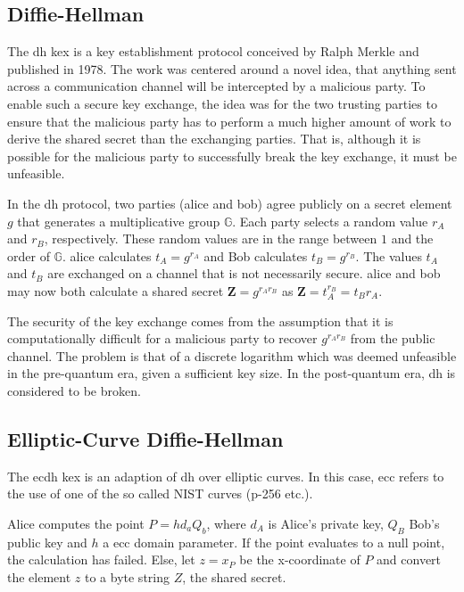 \subsection{Diffie-Hellman}
\label{section:background:diffie-hellman}

The \gls{dh} \gls{kex} is a key establishment protocol conceived by Ralph Merkle and published in 1978\cite{merkle1978}. The work was centered around a novel idea, that anything sent across a communication channel will be intercepted by a malicious party. To enable such a secure key exchange, the idea was for the two trusting parties to ensure that the malicious party has to perform a much higher amount of work to derive the shared secret than the exchanging parties. That is, although it is possible for the malicious party to successfully break the key exchange, it must be unfeasible\cite{merkle1978}.

In the \gls{dh} protocol, two parties (\gls{alice} and \gls{bob}) agree publicly on a secret element $g$ that generates a multiplicative group $\mathbb{G}$. Each party selects a random value $r_A$ and $r_B$, respectively. These random values are in the range between $1$ and the order of $\mathbb{G}$. \gls{alice} calculates $t_A=g^{r_A}$ and Bob calculates $t_B=g^{r_B}$. The values $t_A$ and $t_B$ are exchanged on a channel that is not necessarily secure. \gls{alice} and \gls{bob} may now both calculate a shared secret $\mathbf{Z}=g^{r_A r_B}$ as $\mathbf{Z}=t_A^{r_B}=t_B{r_A}$\cite{merkle1978, boyd2020}.

The security of the key exchange comes from the assumption that it is computationally difficult for a malicious party to recover $g^{r_A r_B}$ from the public channel. The problem is that of a discrete logarithm which was deemed unfeasible in the pre-quantum era, given a sufficient key size\cite{boyd2020}. In the post-quantum era, \gls{dh} is considered to be broken\cite{bernstein2017}.

\subsection{Elliptic-Curve Diffie-Hellman}

The \gls{ecdh} \gls{kex} is an adaption of \gls{dh} over elliptic curves. In this case, \gls{ecc} refers to the use of one of the so called NIST curves (\gls{p-256} etc.)\cite{nist2018}.

Alice computes the point $P=hd_aQ_b$, where $d_A$ is Alice's private key, $Q_B$ Bob's public key and $h$ a \gls{ecc} domain parameter. If the point evaluates to a null point, the calculation has failed. Else, let $z=x_P$ be the x-coordinate of $P$ and convert the element $z$ to a byte string $Z$, the shared secret.

